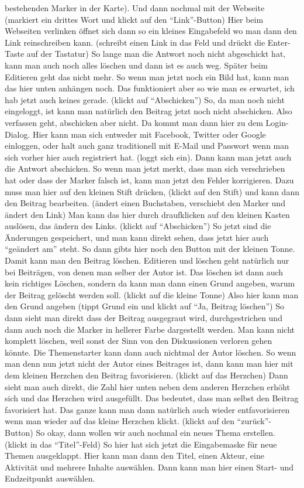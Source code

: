 \begin{itemize}
bestehenden Marker in der Karte). Und dann nochmal mit der Webseite (markiert ein drittes Wort und klickt auf den "`Link"'-Button) Hier beim Webseiten verlinken {\"o}ffnet sich dann so ein kleines Eingabefeld wo man dann den Link reinschreiben kann. (schreibt einen Link in das Feld und dr{\"u}ckt die Enter-Taste auf der Tastatur) So lange man die Antwort noch nicht abgeschickt hat, kann man auch noch alles l{\"o}schen und dann ist es auch weg. Sp{\"a}ter beim Editieren geht das nicht mehr. So wenn man jetzt noch ein Bild hat, kann man das hier unten anh{\"a}ngen noch. Das funktioniert aber so wie man es erwartet, ich hab jetzt auch keines gerade. (klickt auf "`Abschicken"') So, da man noch nicht eingeloggt, ist kann man nat{\"u}rlich den Beitrag jetzt noch nicht abschicken. Also verfassen geht, abschicken aber nicht. Da kommt man dann hier zu dem Login-Dialog. Hier kann man sich entweder mit Facebook, Twitter oder Google einloggen, oder halt auch ganz traditionell mit E-Mail und Passwort wenn man sich vorher hier auch registriert hat. (loggt sich ein). Dann kann man jetzt auch die Antwort abschicken. So wenn man jetzt merkt, dass man sich verschrieben hat oder dass der Marker falsch ist, kann man jetzt den Fehler korrigieren. Dazu muss man hier auf den kleinen Stift dr{\"u}cken, (klickt auf den Stift) und kann dann den Beitrag bearbeiten. ({\"a}ndert einen Buchstaben, verschiebt den Marker und {\"a}ndert den Link) Man kann das hier durch draufklicken auf den kleinen Kasten ausl{\"o}sen, das {\"a}ndern des Links. (klickt auf "`Abschicken"') So jetzt sind die {\"A}nderungen gespeichert, und man kann direkt sehen, dass jetzt hier auch "`ge{\"a}ndert am"' steht. So dann gibts hier noch den Button mit der kleinen Tonne. Damit kann man den Beitrag l{\"o}schen. Editieren und l{\"o}schen geht nat{\"u}rlich nur bei Beitr{\"a}gen, von denen man selber der Autor ist. Das l{\"o}schen ist dann auch kein richtiges L{\"o}schen, sondern da kann man dann einen Grund angeben, warum der Beitrag gel{\"o}scht werden soll. (klickt auf die kleine Tonne) Also hier kann man den Grund angeben (tippt Grund ein und klickt auf "`Ja, Beitrag l{\"o}schen"') So dann sieht man direkt dass der Beitrag ausgegraut wird, durchgestrichen und dann auch noch die Marker in hellerer Farbe dargestellt werden. Man kann nicht komplett l{\"o}schen, weil sonst der Sinn von den Diskussionen verloren gehen k{\"o}nnte. Die Themenstarter kann dann auch nichtmal der Autor l{\"o}schen. So wenn man denn nun jetzt nicht der Autor eines Beitrages ist, dann kann man hier mit dem kleinen Herzchen den Beitrag favorisieren. (klickt auf das Herzchen) Dann sieht man auch direkt, die Zahl hier unten neben dem anderen Herzchen erh{\"o}ht sich und das Herzchen wird ausgef{\"u}llt. Das bedeutet, dass man selbst den Beitrag favorisiert hat. Das ganze kann man dann nat{\"u}rlich auch wieder entfavorisieren wenn man wieder auf das kleine Herzchen klickt. (klickt auf den "`zur{\"u}ck"'-Button) So okay, dann wollen wir auch nochmal ein neues Thema erstellen. (klickt in das "`Titel"'-Feld) So hier hat sich jetzt die Eingabemaske f{\"u}r neue Themen ausgeklappt. Hier kann man dann den Titel, einen Akteur, eine Aktivit{\"a}t und mehrere Inhalte ausw{\"a}hlen. Dann kann man hier einen Start- und Endzeitpunkt ausw{\"a}hlen.  
\end{itemize}
